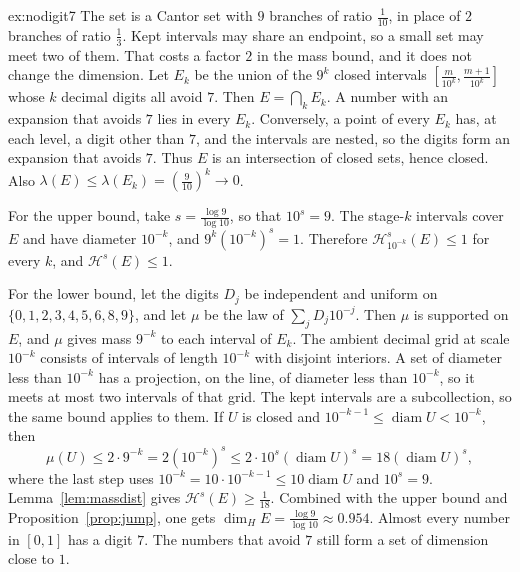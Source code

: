 \begin{solution}{ex:nodigit7}
\idea The set is a Cantor set with $9$ branches of ratio $\frac1{10}$, in place of $2$ branches of ratio $\frac13$. Kept intervals may share an
endpoint, so a small set may meet two of them. That costs a factor $2$ in the mass bound, and it does not change the dimension.
\writeup Let $E_k$ be the union of the $9^k$ closed intervals $[\frac{m}{10^k},\frac{m+1}{10^k}]$ whose $k$ decimal digits all avoid $7$. Then
$E=\bigcap_k E_k$. A number with an expansion that avoids $7$ lies in every $E_k$. Conversely, a point of every $E_k$ has, at each level, a
digit other than $7$, and the intervals are nested, so the digits form an expansion that avoids $7$. Thus $E$ is an intersection of closed
sets, hence closed. Also $\lambda(E)\le\lambda(E_k)=(\frac9{10})^k\to 0$.

For the upper bound, take $s=\frac{\log 9}{\log 10}$, so that $10^s=9$. The stage-$k$ intervals cover $E$ and have diameter $10^{-k}$, and
$9^k(10^{-k})^s=1$. Therefore $\mathcal H^s_{10^{-k}}(E)\le 1$ for every $k$, and $\mathcal H^s(E)\le 1$.

For the lower bound, let the digits $D_j$ be independent and uniform on $\{0,1,2,3,4,5,6,8,9\}$, and let $\mu$ be the law of
$\sum_j D_j 10^{-j}$. Then $\mu$ is supported on $E$, and $\mu$ gives mass $9^{-k}$ to each interval of $E_k$. The ambient decimal grid at
scale $10^{-k}$ consists of intervals of length $10^{-k}$ with disjoint interiors. A set of diameter less than $10^{-k}$ has a projection, on
the line, of diameter less than $10^{-k}$, so it meets at most two intervals of that grid. The kept intervals are a subcollection, so the same
bound applies to them. If $U$ is closed and $10^{-k-1}\le\operatorname{diam}U<10^{-k}$, then
\[\mu(U)\le 2\cdot 9^{-k}=2(10^{-k})^s\le 2\cdot 10^s(\operatorname{diam}U)^s=18(\operatorname{diam}U)^s,\]
where the last step uses $10^{-k}=10\cdot 10^{-k-1}\le 10\operatorname{diam}U$ and $10^s=9$. Lemma~\ref{lem:massdist} gives
$\mathcal H^s(E)\ge\frac1{18}$. Combined with the upper bound and Proposition~\ref{prop:jump}, one gets
$\dim_H E=\frac{\log 9}{\log 10}\approx 0.954$. Almost every number in $[0,1]$ has a digit $7$. The numbers that avoid $7$ still form a set of
dimension close to $1$.
\end{solution}

